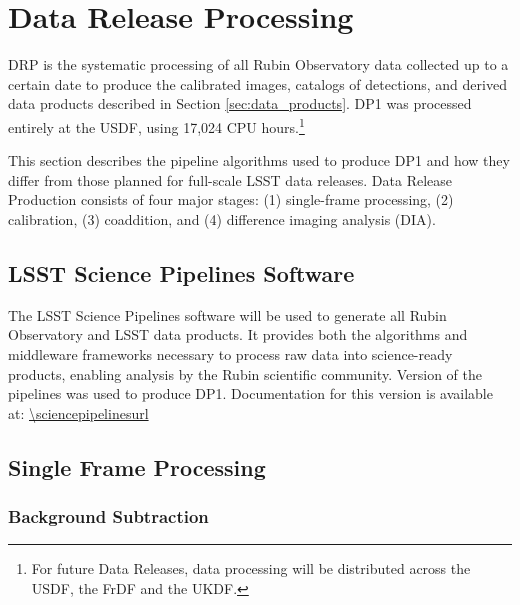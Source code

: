 \section{Data Release Processing}
\label{sec:drp}

\gls{DRP} is the systematic processing of all Rubin Observatory data collected up to a certain date to produce the calibrated images, catalogs of detections, and derived data products described in Section \ref{sec:data_products}.
\gls{DP1} was processed entirely at the \gls{USDF}, using 17,024 CPU hours.\footnote{For future Data Releases, data processing will be distributed across the \gls{USDF}, the \gls{FrDF} and the \gls{UKDF}.}

This section describes the pipeline algorithms used to produce \gls{DP1} and how they differ from those planned for full-scale LSST data releases.
Data Release Production consists of four major stages: (1) single-frame processing, (2) calibration, (3) coaddition, and (4) difference imaging analysis (\gls{DIA}).

\subsection{LSST Science Pipelines Software}
\label{ssec:pipelines}
The \gls{LSST Science Pipelines} software \citep{PSTN-019, LDM-151} will be used to generate all Rubin Observatory and LSST data products.
It provides both the \glspl{algorithm} and \gls{middleware} frameworks necessary to process raw data into science-ready products, enabling analysis by the Rubin scientific community.
Version \sciencepipelinesversion of the pipelines was used to produce \gls{DP1}.
Documentation for this version is available at: \url{\sciencepipelinesurl}

\subsection{Single Frame Processing
\label{ssec:single_frame_processing}}



\subsubsection{Background Subtraction}
\label{ssec:background_subtraction}

